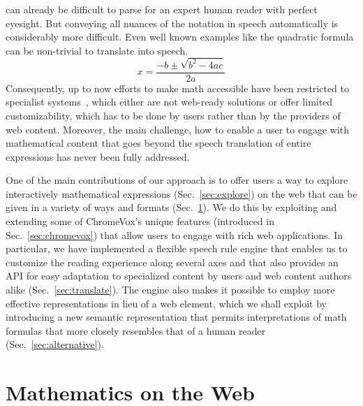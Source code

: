 \documentclass{sig-alternate}
\begin{document}
\noindent can already be difficult to parse for an expert human reader with
perfect eyesight. But conveying all nuances of the notation in speech
automatically is considerably more difficult. Even well known examples
like the quadratic formula can be non-trivial to translate into speech.
\begin{equation}
  \label{eq:quadratic}
  x=\frac{-b \pm \sqrt {b^2-4ac}}{2a}
\end{equation}
Consequently, up to now efforts to make math accessible have been restricted to
specialist
systems~\cite{raman1994aster,soiffer2005mathplayer,chen2006clc,yamaguchi2008new},
which either are not web-ready solutions or offer limited customizability, which
has to be done by users rather than by the providers of web content. Moreover,
the main challenge, how to enable a user to engage with mathematical content
that goes beyond the speech translation of entire expressions has never been
fully addressed.

One of the main contributions of our approach is to offer users a way to explore
interactively mathematical expressions (Sec.~\ref{sec:explore}) on the web that
can be given in a variety of ways and formats (Sec.~\ref{sec:math}). We do this
by exploiting and extending some of ChromeVox's unique features (introduced in
Sec.~\ref{sec:chromevox}) that allow users to engage with rich web
applications. In particular, we have implemented a flexible speech rule engine
that enables us to customize the reading experience along several axes and that
also provides an API for easy adaptation to specialized content by users and web
content authors alike (Sec.~\ref{sec:translate}).  The engine also makes it
possible to employ more effective representations in lieu of a web element,
which we shall exploit by introducing a new semantic representation that permits
interpretations of math formulas that more closely resembles that of a human
reader (Sec.~\ref{sec:alternative}).


\section{Mathematics on the Web}
\label{sec:math}
\end{document}

